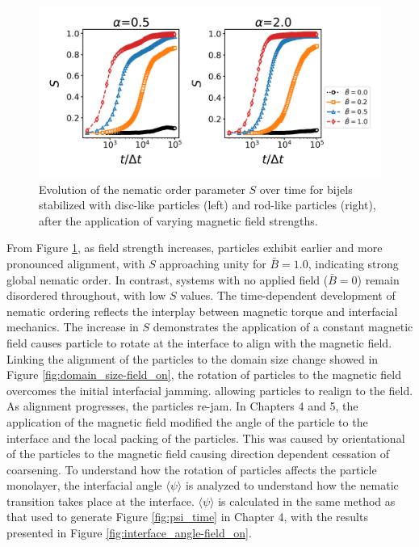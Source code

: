 \begin{figure} 
    \centering 
    \includegraphics[scale=0.4]{../figures/results/paper2/nematic-field_on.png} 
    \caption{Evolution of the nematic order parameter \( S \) over time for bijels stabilized with disc-like particles (left) and rod-like particles (right), 
             after the application of varying magnetic field strengths.} 
    \label{fig:nematic-field_on} 
\end{figure}

From Figure \ref{fig:nematic-field_on}, as field strength increases, particles exhibit earlier and more pronounced alignment, with \( S \) approaching unity 
for \( \bar{B} = 1.0 \), indicating strong global nematic order. In contrast, systems with no applied field (\( \bar{B} = 0 \)) remain disordered throughout, 
with low \( S \) values. The time-dependent development of nematic ordering reflects the interplay between magnetic torque and interfacial mechanics. 
The increase in \( S \) demonstrates the application of a constant magnetic field causes particle to rotate at the interface to align with the magnetic field.
Linking the alignment of the particles to the domain size change showed in Figure \ref{fig:domain_size-field_on}, the rotation of particles to the magnetic field 
overcomes the initial interfacial jamming. allowing particles to realign to the field. As alignment 
progresses, the particles re-jam. In Chapters 4 and 5, the application of the magnetic field modified the angle of the particle to the interface and the
local packing of the particles. This was caused by orientational of the particles to the magnetic field causing direction dependent cessation of coarsening.
To understand how the rotation of particles affects the particle monolayer, the interfacial angle $\langle \psi \rangle$ is analyzed to understand
how the nematic transition takes place at the interface. $\langle \psi \rangle$ is calculated in the same method as that used to generate Figure \ref{fig:psi_time} 
in Chapter 4, with the results presented in Figure \ref{fig:interface_angle-field_on}. 

